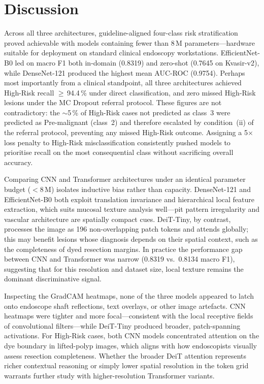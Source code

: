 \documentclass[11pt,a4paper]{article}
\begin{document}
\section{Discussion}
\label{sec:discussion}

Across all three architectures, guideline-aligned four-class risk
stratification proved achievable with models containing fewer than 8\,M
parameters---hardware suitable for deployment on standard clinical
endoscopy workstations. EfficientNet-B0 led on macro F1 both in-domain
(0.8319) and zero-shot (0.7645 on Kvasir-v2), while DenseNet-121 produced
the highest mean AUC-ROC (0.9754). Perhaps most importantly from a clinical
standpoint, all three architectures achieved High-Risk recall
$\geq$\,94.4\,\% under direct classification, and zero missed High-Risk
lesions under the MC Dropout referral protocol. These figures are not
contradictory: the $\sim$5\,\% of High-Risk cases not predicted as
class~3 were predicted as Pre-malignant (class~2) and therefore
escalated by condition~(ii) of the referral protocol, preventing any
missed High-Risk outcome.
Assigning a 5$\times$ loss penalty to High-Risk misclassification
consistently pushed models to prioritise recall on the most consequential
class without sacrificing overall accuracy.

Comparing CNN and Transformer architectures under an identical parameter
budget ($<$8\,M) isolates inductive bias rather than capacity. DenseNet-121
and EfficientNet-B0 both exploit translation invariance and hierarchical
local feature extraction, which suits mucosal texture analysis well---pit
pattern irregularity and vascular architecture are spatially compact cues.
DeiT-Tiny, by contrast, processes the image as 196 non-overlapping patch
tokens and attends globally; this may benefit lesions whose diagnosis depends
on their spatial context, such as the completeness of dyed resection margins.
In practice the performance gap between CNN and Transformer was narrow
(0.8319 vs.\ 0.8134 macro F1), suggesting that for this resolution and
dataset size, local texture remains the dominant discriminative signal.

Inspecting the GradCAM heatmaps, none of the three models appeared to latch
onto endoscope shaft reflections, text overlays, or other image artefacts.
CNN heatmaps were tighter and more focal---consistent with the local
receptive fields of convolutional filters---while DeiT-Tiny produced
broader, patch-spanning activations. For High-Risk cases, both CNN models
concentrated attention on the dye boundary in lifted-polyp images, which
aligns with how endoscopists visually assess resection completeness. Whether
the broader DeiT attention represents richer contextual reasoning or simply
lower spatial resolution in the token grid warrants further study with
higher-resolution Transformer variants.
\end{document}

